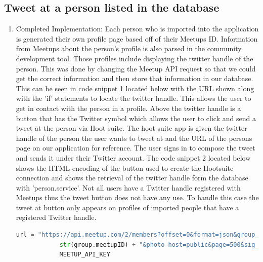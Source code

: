 \documentclass[draftclsnofoot,10pt,onecolumn]{IEEEtran} %
\begin{document}
\subsection{Tweet at a person listed in the database}
\begin{enumerate}
  \item Completed Implementation: Each person who is imported into the application
    is generated their own profile page based off of their Meetups ID. Information from 
    Meetups about the person’s profile is also parsed in the community development tool. Those profiles
    include displaying the twitter handle of the person. This was done by changing
    the Meetup API request so that we could get the correct information and
    then store that information in our database. This can be seen in code snippet 1 located below 
    with the URL shown along with the 'if' statements to locate the twitter handle. This allows the user to get 
    in contact with the person in a profile. Above the
    twitter handle is a button that has the Twitter symbol which allows the user
    to click and send a tweet at the person via Hoot-suite. The hoot-suite app is
    given the twitter handle of the person the user wants to tweet at and the URL
    of the persons page on our application for reference. The user signs in to
    compose the tweet and sends it under their Twitter account. The code snippet 2 located below 
    shows the HTML encoding of the button used to create the Hootsuite connection and shows the 
    retrieval of the twitter handle form the database with 'person.service'. Not all users have a
    Twitter handle registered with Meetups thus the tweet button does not have any use. To handle this case
    the tweet at button only appears on profiles of imported people that have a registered Twitter handle.
    
    \newpage
      

\begin{center}
  \captionsetup{width=.5\linewidth}
  \begin{lstlisting}[caption=Views.py file where twitter handle is identified and stored, language=Python]
            url = "https://api.meetup.com/2/members?offset=0&format=json&group_id=" + 
            str(group.meetupID) + "&photo-host=public&page=500&sig_id=148657742&key=" + 
            MEETUP_API_KEY
           

\end{lstlisting}
\end{center}
\end{enumerate}
\end{document}
